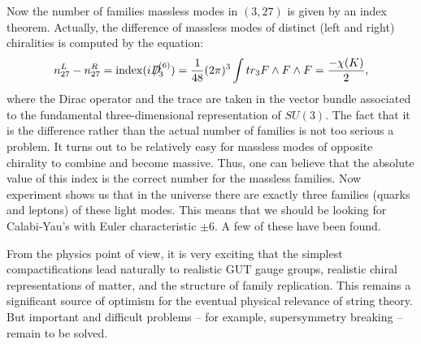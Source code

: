 Now the number of families massless modes in $(3,27)$ is given by an index
theorem.  Actually, the difference of massless modes of distinct (left
and right) chiralities is computed by the equation:
$$n^L_{27}-n^R_{27}={\rm
index}(iD\hskip-.67em\slash_3^{(6)})=\frac{1}{48}(2\pi)^3\int tr_3F\wedge
F\wedge F =\frac{-\chi(K)}{2},$$
where the Dirac operator and the trace are taken in the vector bundle
associated to the fundamental
three-dimensional representation of $SU(3)$.
The fact that it is the difference rather than the actual number of
families is not too serious a problem.  It turns out to be relatively
easy for massless modes of opposite chirality to combine and become
massive. Thus, one can believe that the absolute value of this index
is the correct number for the massless families.
Now experiment shows us that in the universe there are exactly three
families (quarks and leptons) of these light modes. 
This means that we should be looking for
Calabi-Yau's with Euler characteristic $\pm 6$.  A few of these have
been found.

{}From the physics point of view, it is very exciting that the simplest
compactifications lead naturally to realistic GUT gauge groups,
realistic chiral representations of matter, and the structure of family
replication.  This remains a significant source of optimism for the
eventual physical relevance of string theory.  But important and
difficult problems -- for example, supersymmetry breaking -- remain to 
be solved.










